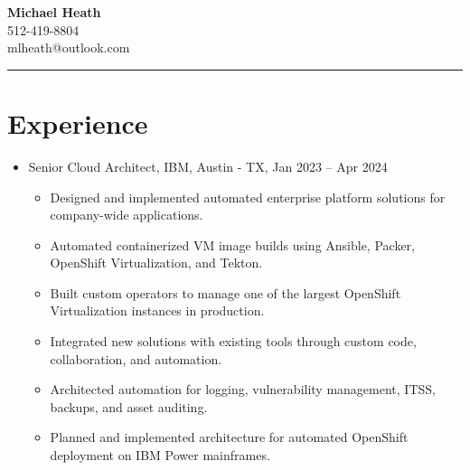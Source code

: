 \documentclass[letterpaper]{article}
\makeatletter
\def\name{Michael Heath}
\def\phone{512-419-8804}
\def\email{mlheath@outlook.com}
\makeatother
\begin{document}
\begin{center}
    {\huge\textbf{\name}}\\
    {\small\phone \\ \email}
\end{center}

\textcolor{blue}{\rule{\linewidth}{1pt}}

\vspace{0.5em}
\begin{minipage}{\dimexpr\textwidth-1in\relax}
    \section*{Experience}
    \begin{itemize}
        \item Senior Cloud Architect, IBM, Austin - TX, Jan 2023 -- Apr 2024
        \begin{itemize}
            \item Designed and implemented automated enterprise platform solutions for company-wide applications.
            \item Automated containerized VM image builds using Ansible, Packer, OpenShift Virtualization, and Tekton.
            \item Built custom operators to manage one of the largest OpenShift Virtualization instances in production.
            \item Integrated new solutions with existing tools through custom code, collaboration, and automation.
            \item Architected automation for logging, vulnerability management, ITSS, backups, and asset auditing.
            \item Planned and implemented architecture for automated OpenShift deployment on IBM Power mainframes. \\
        \end{itemize}
    \end{itemize}


\end{minipage}
\end{document}
